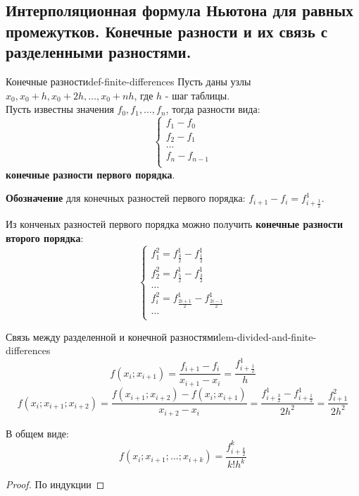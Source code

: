 \documentclass[14pt]{extarticle}
\begin{document}
\subsection{Интерполяционная формула Ньютона для равных промежутков. Конечные разности и их связь с разделенными разностями.}

    \begin{definition}{Конечные разности}{def-finite-differences}
        Пусть даны узлы $x_{0}, x_{0} + h, x_{0} + 2h, \ldots, x_{0} + nh$, где $h$ - шаг таблицы.\\
        Пусть известны значения $f_{0}, f_{1}, \ldots, f_{n}$, тогда разности вида:
        $$
        \begin{cases}
            f_{1} - f_{0}\\
            f_{2} - f_{1}\\
            \ldots\\
            f_{n} - f_{n-1}\\
        \end{cases}
        $$
        \textbf{конечные разности первого порядка}.

        \vspace{\baselineskip}

        \textbf{Обозначение} для конечных разностей первого порядка: $f_{i + 1} - f_{i} = f_{i + \frac{1}{2}}^{1}$.

        \vspace{\baselineskip}

        Из конченых разностей первого порядка можно получить \textbf{конечные разности второго порядка}:
        $$
        \begin{cases}
            f_{1}^{2} = f_{\frac{3}{2}}^{1} - f_{\frac{1}{2}}^{1}\\
            f_{2}^{2} = f_{\frac{5}{2}}^{1} - f_{\frac{3}{2}}^{1}\\
            \ldots\\
            f_{i}^{2} = f_{\frac{2i + 1}{2}}^{1} - f_{\frac{2i - 1}{2}}^{1}\\
            \ldots\\
        \end{cases}
        $$
    \end{definition}

    \clearpage
    \begin{lemma}{Связь между разделенной и конечной разностями}{lem-divided-and-finite-differences}
        $$f(x_{i}; x_{i+1}) = \frac{f_{i+1} - f_{i}}{x_{i+1} - x_{i}} = \frac{f_{i+\frac{1}{2}}^{1}}{h}$$
        $$f(x_{i}; x_{i+1}; x_{i+2}) = \frac{f(x_{i+1}; x_{i+2}) - f(x_{i}; x_{i+1})}{x_{i+2} - x_{i}} = \frac{f_{i + \frac{3}{2}}^{1} - f_{i + \frac{1}{2}}^{1}}{2h^{2}} = \frac{f_{i+1}^{2}}{2h^{2}}$$
        
        В общем виде:
        $$f(x_{i}; x_{i+1}; \ldots; x_{i + k}) = \frac{f_{i + \frac{k}{2}}^{k}}{k!h^{k}}$$

        \begin{proof}
            По индукции
        \end{proof}
    \end{lemma}
\end{document}
